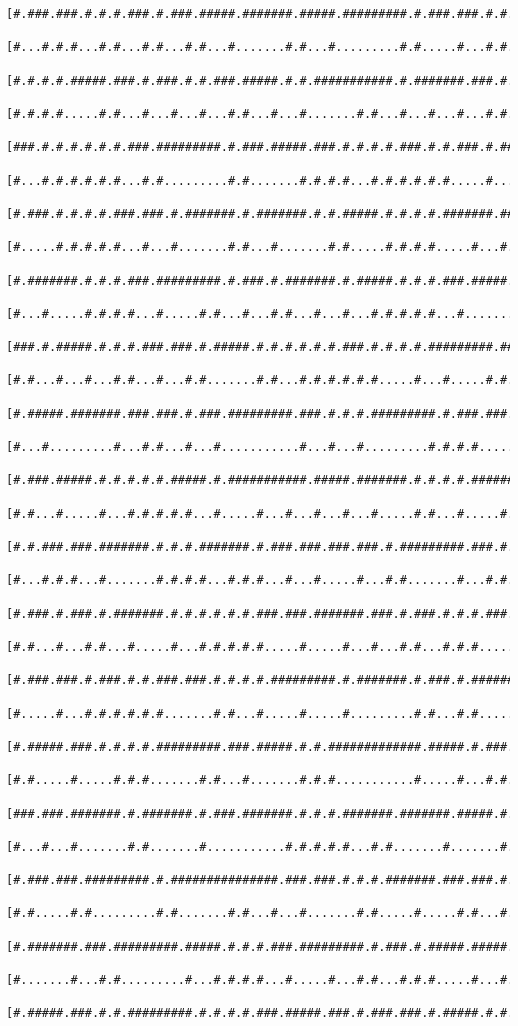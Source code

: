 \documentclass[a4paper,10pt,ngerman]{scrartcl}
\begin{document}
\begin{lstlisting}[frame=tb]
 [#.###.###.#.#.#.###.#.###.#####.#######.#####.#########.#.###.###.#.#.#########.#]
 [#...#.#.#...#.#...#.#...#.#...#.......#.#...#.........#.#.....#...#.#.#.......#.#]
 [#.#.#.#.#####.###.#.###.#.#.###.#####.#.#.###########.#.#######.###.#.#.#.#####.#]
 [#.#.#.#.....#.#...#...#...#...#.#...#...#.......#.#...#...#...#...#.#...#.#...#.#]
 [###.#.#.#.#.#.#.###.#########.#.###.#####.###.#.#.#.#.###.#.#.###.#.#######.#.#.#]
 [#...#.#.#.#.#.#...#.#.........#.#.......#.#.#.#...#.#.#.#.#.#.....#.........#...#]
 [#.###.#.#.#.#.###.###.#.#######.#.#######.#.#.#####.#.#.#.#.#######.#####.#######]
 [#.....#.#.#.#.#...#...#.......#.#...#.......#.#.....#.#.#.#.....#...#...#.#.....#]
 [#.#######.#.#.#.###.#########.#.###.#.#######.#.#####.#.#.#.###.#####.#.###.###.#]
 [#...#.....#.#.#.#...#.....#.#...#...#.#...#...#...#.#.#.#.#...#.......#.....#...#]
 [###.#.#####.#.#.#.###.###.#.#####.#.#.#.#.#.#.###.#.#.#.#.#########.#####.###.#.#]
 [#.#...#...#...#.#...#...#.#.......#.#...#.#.#.#.#.#.....#...#.....#.#...#.#...#.#]
 [#.#####.#######.###.###.#.###.#########.###.#.#.#.#########.#.###.###.#.#.#.###.#]
 [#...#.........#...#.#...#...#...........#...#...#.........#.#.#.#.....#.#.#...#.#]
 [#.###.#####.#.#.#.#.#.#####.#.###########.#####.#######.#.#.#.#.#######.#.###.###]
 [#.#...#.....#...#.#.#.#.#...#.....#...#...#...#...#.....#.#...#.....#...#.#.#...#]
 [#.#.###.###.#######.#.#.#.#######.#.###.###.###.###.#.#########.###.#.###.#.###.#]
 [#...#.#.#...#.......#.#.#.#...#.#.#...#...#.....#...#.#.......#...#.#.#.....#...#]
 [#.###.#.###.#.#######.#.#.#.#.#.#.###.###.#######.###.#.###.#.#.#.###.#.#####.#.#]
 [#.#...#...#.#...#.....#...#.#.#.#.#.....#.....#...#...#.#...#.#.#.....#.#.....#.#]
 [#.###.###.#.###.#.#.###.###.#.#.#.#.#########.#.#######.#.###.#.#########.#####.#]
 [#.....#...#.#.#.#.#.#.......#.#...#.....#.....#.........#.#...#.#.....#...#...#.#]
 [#.#####.###.#.#.#.#.#########.###.#####.#.#.#############.#####.#.###.#.###.#.#.#]
 [#.#.....#.....#.#.#.......#.#...#.......#.#.#...........#.....#...#.#.#.#...#.#.#]
 [###.###.#######.#.#######.#.###.#######.#.#.#.#######.#######.#####.#.#.#.#.###.#]
 [#...#...#.......#.#.......#...........#.#.#.#.#...#.#.......#.......#.#.#.#.....#]
 [#.###.###.#########.#.###############.###.###.#.#.#.#######.###.###.#.#.#########]
 [#.#.....#.#.........#.#.......#.#...#...#.......#.#.....#.....#.#...#.#.........#]
 [#.#######.###.#########.#####.#.#.#.###.#########.#.###.#.#####.#####.#########.#]
 [#.......#...#.#.........#...#.#.#.#...#.....#...#.#...#.#.#.....#...#.#...#...#.#]
 [#.#####.###.#.#.#########.#.#.#.#.###.#####.###.#.###.###.#.#####.#.#.#.#.#.#.#.#]

\end{lstlisting}
\end{document}
